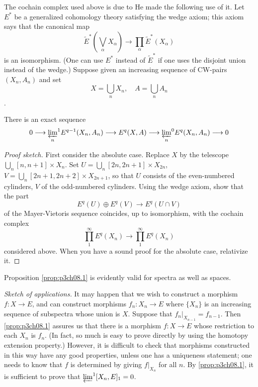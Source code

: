 \documentclass[../main]{subfiles}
\begin{document}
\par The cochain complex used above is due to  He made the following use of it. Let $E^*$ be a generalized cohomology theory satisfying the wedge axiom; this axiom says that the canonical map 
$$\tilde{E}^*\left(\bigvee_\alpha X_\alpha\right)\longrightarrow \prod_\alpha \tilde{E}^*(X_\alpha)$$
is an isomorphism. (One can use $E^*$ instead of $\tilde{E}^*$ if one uses the disjoint union instead of the wedge.) Suppose given an increasing sequence of CW-pairs $(X_n,A_n)$ and set
$$X=\bigcup_n X_n, \quad A=\bigcup_n A_n$$.
\begin{proposition}[Milnor] \label{prop:p3ch08.1}
    There is an exact sequence
    $$0\longrightarrow {\varprojlim_n}^1E^{q-1}(X_n,A_n)\longrightarrow E^q(X,A)\longrightarrow {\varprojlim_n}^0E^q(X_n,A_n)\longrightarrow 0$$
\end{proposition}
\begin{proof}[Proof sketch]
First consider the absolute case. Replace $X$ by the telescope $\bigcup_n[n,n+1]\times X_n$. Set $U=\bigcup_n[2n,2n+1]\times X_{2n}$, $V=\bigcup_n[2n+1,2n+2]\times X_{2n+1}$, so that $U$ consists of the even-numbered cylinders, $V$ of the odd-numbered cylinders. Using the wedge axiom, show that the part 
$$E^q(U)\oplus E^q(V)\longrightarrow E^q(U\cap V)$$
of the Mayer-Vietoris sequence coincides, up to isomorphism, with the cochain complex
$$\prod_1^\infty E^q(X_n) \longrightarrow \prod_1^\infty E^q(X_n)$$
considered above. When you have a sound proof for the absolute case, relativize it.
\end{proof}
Proposition \ref{prop:p3ch08.1} is evidently valid for spectra as well as spaces.
\par \emph{Sketch of applications.} It may happen that we wish to construct a morphism $f:X\longrightarrow E$, and can construct morphisms $f_n:X_n\longrightarrow E$ where $\{X_n\}$ is an increasing sequence of subspectra whose union is $X$. Suppose that $f_n|_{X_{n-1}} = f_{n-1}$. Then \ref{prop:p3ch08.1} assures us that there is a morphism $f:X\longrightarrow E$ whose restriction to each $X_n$ is $f_n$. (In fact, so much is easy to prove directly by using the homotopy extension property.) However, it is difficult to check that morphisms constructed in this way have any good properties, unless one has a uniqueness statement; one needs to know that $f$ is determined by giving $f|_{X_n}$ for all $n$. By \ref{prop:p3ch08.1}, it is sufficient to prove that ${\varprojlim}^1[X_n,E]_1=0$.
\end{document}
